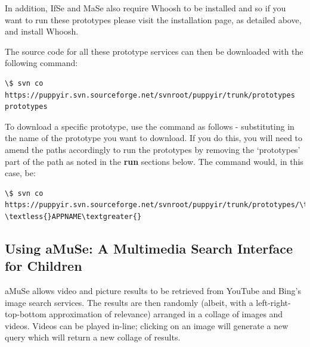 \documentclass[letterpaper,10pt,english]{sphinxmanual}
\begin{document}
In addition, IfSe and MaSe also require Whoosh to be installed and so if you want to run these prototypes please visit the installation page, as detailed above, and install Whoosh.

The source code for all these prototype services can then be downloaded with the following command:

\begin{Verbatim}[commandchars=\\\{\}]
\$ svn co https://puppyir.svn.sourceforge.net/svnroot/puppyir/trunk/prototypes prototypes
\end{Verbatim}

To download a specific prototype, use the command as follows - substituting in the name of the prototype you want to download. If you do this, you will need to amend the paths accordingly to run the prototypes by removing the `prototypes' part of the path as noted in the \textbf{run} sections below. The command would, in this case, be:

\begin{Verbatim}[commandchars=\\\{\}]
\$ svn co https://puppyir.svn.sourceforge.net/svnroot/puppyir/trunk/prototypes/\textless{}APPNAME\textgreater{} \textless{}APPNAME\textgreater{}
\end{Verbatim}


\subsection{Using aMuSe: A Multimedia Search Interface for Children}
\label{prototypes:using-amuse-a-multimedia-search-interface-for-children}
aMuSe allows video and picture results to be retrieved from YouTube and Bing's image search services. The results are then randomly (albeit, with a left-right-top-bottom approximation of relevance) arranged in a collage of images and videos. Videos can be played in-line; clicking on an image will generate a new query which will return a new collage of results.
\end{document}
